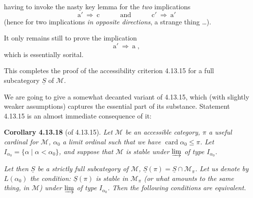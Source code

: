 \documentclass[11pt]{article}
\newcommand{\printedpage}[1]{\marginpar{\footnotesize p.~#1}}
\newcommand{\msp}[1]{\marginpar{\footnotesize [#1]}}
\DeclareMathOperator{\card}{card}
\begin{document}
 having to invoke the nasty key lemma for the \textit{two} implications
\[
\mathrm{a}' \ \Longrightarrow \ \mathrm{c} \qquad\quad \text{and} \qquad\quad \mathrm{c}' \ \Longrightarrow \ \mathrm{a}'
\]
(hence for two implications \textit{in opposite directions}, a strange thing \dots).

\msp{page 337}

It only remains still to prove the implication
\[
\mathrm{a}' \ \Longrightarrow \ \mathrm{a} \; ,
\]
which is essentially sorital.

This completes the proof of the accessibility criterion 4.13.15 for a full subcategory $\underline{S}$ of $\mathcal{M}$.

We are going to give a somewhat decanted variant of 4.13.15, which (with slightly weaker assumptions) captures the essential part of its substance. Statement 4.13.15 is an almost immediate consequence of it:

\printedpage{128}

\msp{page 338}

\textbf{Corollary 4.13.18} (of 4.13.15). \textit{Let $\mathcal{M}$ be an accessible category, $\pi$ a useful cardinal for $\mathcal{M}$, $\alpha_0$ a \textup{limit ordinal} such that we have $\card\alpha_0 \leqslant \pi$. Let $I_{\alpha_0} = \{\alpha \mid \alpha < \alpha_0\}$, and suppose that $\mathcal{M}$ is stable under $\varinjlim$ of type $I_{\alpha_0}$.}

\textit{Let then $\underline{S}$ be a strictly full subcategory of $\mathcal{M}$, $\underline{S}(\pi) = \underline{S}\cap\mathcal{M}_\pi$. Let us denote by $L(\alpha_0)$ the condition: $\underline{S}(\pi)$ is stable in $\mathcal{M}_\pi$ (or what amounts to the same thing, in $\mathcal{M}$) under $\varinjlim$ of type $I_{\alpha_0}$. Then the following conditions are equivalent.}
\end{document}
